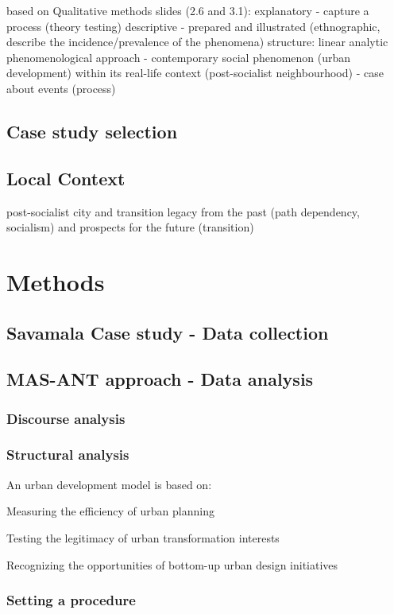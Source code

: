 \documentclass[11pt]{report}
\begin{document}
based on Qualitative methods slides (2.6 and 3.1):
explanatory - capture a process (theory testing)
descriptive - prepared and illustrated (ethnographic, describe the incidence/prevalence of the phenomena)
structure: linear analytic
phenomenological approach - contemporary social phenomenon (urban development) within its real-life context (post-socialist neighbourhood) - case about events (process)


\subsection{Case study selection}
\subsection{Local Context}

post-socialist city and transition
legacy from the past (path dependency, socialism) and prospects for the future (transition)

\section{Methods}

\subsection{Savamala Case study - Data collection} \label{sec:predis}

\subsection{MAS-ANT approach - Data analysis}

\subsubsection{Discourse analysis}
\subsubsection{Structural analysis}

An urban development model is based on:

Measuring the efficiency of urban planning

Testing the legitimacy of urban transformation interests

Recognizing the opportunities of bottom-up urban design initiatives


\subsubsection{Setting a procedure}
\end{document}
